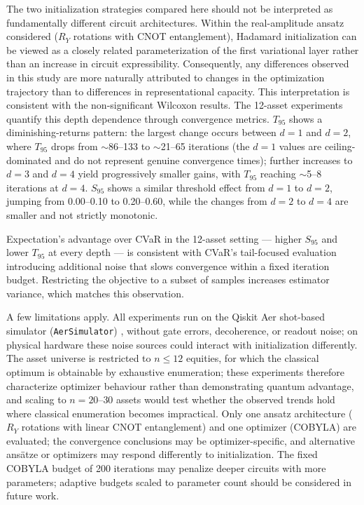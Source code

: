 \documentclass[runningheads]{llncs}
\begin{document}
The two initialization strategies compared here should not be interpreted as fundamentally different circuit architectures. Within the real-amplitude ansatz considered ($R_Y$ rotations with CNOT entanglement), Hadamard initialization can be viewed as a closely related parameterization of the first variational layer rather than an increase in circuit expressibility. Consequently, any differences observed in this study are more naturally attributed to changes in the optimization trajectory than to differences in representational capacity. This interpretation is consistent with the non-significant Wilcoxon results.
The 12-asset experiments quantify this depth dependence through convergence metrics. $T_{95}$ shows a diminishing-returns pattern: the largest change occurs between $d = 1$ and $d = 2$, where $T_{95}$ drops from $\sim$86--133 to $\sim$21--65 iterations (the $d = 1$ values are ceiling-dominated and do not represent genuine convergence times); further increases to $d = 3$ and $d = 4$ yield progressively smaller gains, with $T_{95}$ reaching $\sim$5--8 iterations at $d = 4$. $S_{95}$ shows a similar threshold effect from $d = 1$ to $d = 2$, jumping from 0.00--0.10 to 0.20--0.60, while the changes from $d = 2$ to $d = 4$ are smaller and not strictly monotonic.

Expectation's advantage over CVaR in the 12-asset setting --- higher $S_{95}$ and lower $T_{95}$ at every depth --- is consistent with CVaR's tail-focused evaluation introducing additional noise that slows convergence within a fixed iteration budget. Restricting the objective to a subset of samples increases estimator variance, which matches this observation.

A few limitations apply. All experiments run on the Qiskit Aer shot-based simulator (\texttt{AerSimulator}) \cite{qiskit}, without gate errors, decoherence, or readout noise; on physical hardware these noise sources could interact with initialization differently. The asset universe is restricted to $n \leq 12$ equities, for which the classical optimum is obtainable by exhaustive enumeration; these experiments therefore characterize optimizer behaviour rather than demonstrating quantum advantage, and scaling to $n = 20$--$30$ assets would test whether the observed trends hold where classical enumeration becomes impractical. Only one ansatz architecture ($R_Y$ rotations with linear CNOT entanglement) and one optimizer (COBYLA) are evaluated; the convergence conclusions may be optimizer-specific, and alternative ans\"atze or optimizers may respond differently to initialization. The fixed COBYLA budget of 200 iterations may penalize deeper circuits with more parameters; adaptive budgets scaled to parameter count should be considered in future work.
\end{document}
